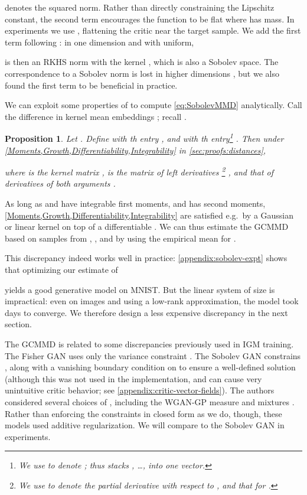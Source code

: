 \documentclass{article}
\let\citep\parencite
\newtheorem{prop}[lem]{Proposition}
\begin{document}
 denotes the squared  norm.
Rather than directly constraining the Lipschitz constant,
the second term 
encourages the function  to be flat where  has mass.
In experiments we use ,
flattening the critic near the target sample.
We add the first term following \cite{Bousquet:2004}:
in one dimension and with  uniform,

is then an RKHS norm with the kernel
,
which is also a Sobolev space.
The correspondence to a Sobolev norm is lost in higher dimensions \citep[][Ch. 10]{Wendland05},
but we also found the first term to be beneficial in practice.

We can exploit some properties of 
to compute \eqref{eq:SobolevMMD} analytically.
Call the difference in kernel mean embeddings
;
recall .
\begin{prop} \label{prop:Finite_rank_approx}
  Let . Define  with th entry ,
  and  with th entry\footnote{We use  to denote ;
    thus  stacks , \dots,  into one vector.
  } .
  Then under \cref{Moments,Growth,Differentiability,Integrability} in \cref{sec:proofs:distances},

  where  is the kernel matrix ,
   is the matrix of left derivatives \footnote{We use  to denote the partial derivative with respect to ,
    and  that for .
  }
  ,
  and  that of derivatives of both arguments .
\end{prop}
As long as  and  have integrable first moments, and  has second moments,
\cref{Moments,Growth,Differentiability,Integrability} are satisfied e.g.\ by a Gaussian or linear kernel on top of a differentiable .
We can thus estimate the GCMMD based on samples from , , and  by using the empirical mean  for .

This discrepancy indeed works well in practice:
\cref{appendix:sobolev-expt} shows that optimizing our estimate of

yields a good generative model on MNIST.
But the linear system of size  is impractical:
even on  images
and using a low-rank approximation,
the model took days to converge.
We therefore design a less expensive discrepancy in the next section.

The GCMMD is related to some discrepancies previously used in IGM training.
The Fisher GAN \citep{fisher-gan}
uses only the variance constraint
.
The Sobolev GAN \citep{sobolev-gan}
constrains ,
along with a vanishing boundary condition on 
to ensure a well-defined solution (although this was not used in the implementation,
and can cause very unintuitive critic behavior; see \cref{appendix:critic-vector-fields}).
The authors considered several choices of ,
including the WGAN-GP  measure \citep{wgan-gp} and mixtures .
Rather than enforcing the constraints in closed form as we do, though,
these models used additive regularization. We will compare to the Sobolev GAN in experiments.
\end{document}
